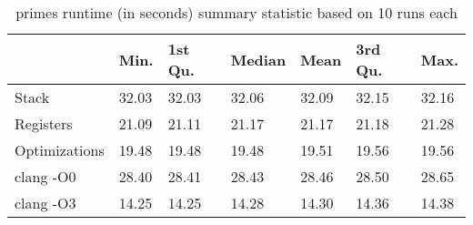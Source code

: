\begin{table}[h!]
\centering
\begin{tabular}{p{}p{}p{}p{}p{}p{}p{}}
  \hline
 & Min. & 1st Qu. & Median & Mean & 3rd Qu. & Max. \\ 
  \hline
Stack & 32.03 & 32.03 & 32.06 & 32.09 & 32.15 & 32.16 \\ 
  Registers & 21.09 & 21.11 & 21.17 & 21.17 & 21.18 & 21.28 \\ 
  Optimizations & 19.48 & 19.48 & 19.48 & 19.51 & 19.56 & 19.56 \\ 
  clang -O0 & 28.40 & 28.41 & 28.43 & 28.46 & 28.50 & 28.65 \\ 
  clang -O3 & 14.25 & 14.25 & 14.28 & 14.30 & 14.36 & 14.38 \\ 
   \hline
\end{tabular}
\caption{primes runtime (in seconds) summary statistic based on 10 runs each}
\end{table}
